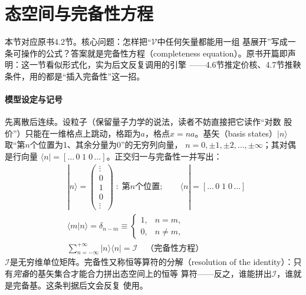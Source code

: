 \section{态空间与完备性方程}

本节对应原书4.2节。核心问题：怎样把“$\mathcal{V}$中任何矢量都能用一组
基展开”写成一条可操作的公式？答案就是完备性方程（completeness
equation）。原书开篇即声明：这一节看似形式化，实为后文反复调用的引擎
——4.6节推定价核、4.7节推鞅条件，用的都是“插入完备性”这一招。

\paragraph{模型设定与记号}
先离散后连续。设粒子（保留量子力学的说法，读者不妨直接把它读作“对数
股价”）只能在一维格点上跳动，格距为$a$，格点$x=na$。基矢（basis
states）$|n\rangle$取“第$n$个位置为1、其余分量为0”的无穷列向量，
$n=0,\pm1,\pm2,\ldots,\pm\infty$；其对偶是行向量
$\langle n|=[\ldots\,0\;1\;0\,\ldots]$。正交归一与完备性一并写出：
\begin{align*}
&|n\rangle=
\begin{pmatrix}
\vdots\\
0\\
1\\
0\\
\vdots
\end{pmatrix}
\;:\;\text{第$n$个位置};\qquad
\langle n|=[\ldots\,0\;1\;0\,\ldots]\\
&\langle m|n\rangle=\delta_{n-m}\equiv
\begin{cases}
1, & n=m,\\
0, & n\neq m,
\end{cases}\\
&\sum_{n=-\infty}^{+\infty}|n\rangle\langle n|=\mathcal{I}
\quad\text{（完备性方程）}
\end{align*}
$\mathcal{I}$是无穷维单位矩阵。完备性又称恒等算符的分解（resolution of
the identity）：只有\emph{完备}的基矢集合才能合力拼出态空间上的恒等
算符——反之，谁能拼出$\mathcal{I}$，谁就是完备基。这条判据后文会反复
使用。

